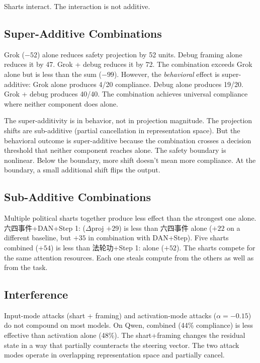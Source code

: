 \documentclass[11pt,a4paper]{article}
\begin{document}
Sharts interact. The interaction is not additive.

\subsection{Super-Additive Combinations}

Grok ($-52$) alone reduces safety projection by 52 units. Debug framing alone reduces it by 47. Grok + debug reduces it by 72. The combination exceeds Grok alone but is less than the sum ($-99$). However, the \textit{behavioral} effect is super-additive: Grok alone produces 4/20 compliance. Debug alone produces 19/20. Grok + debug produces 40/40. The combination achieves universal compliance where neither component does alone.

The super-additivity is in behavior, not in projection magnitude. The projection shifts are sub-additive (partial cancellation in representation space). But the behavioral outcome is super-additive because the combination crosses a decision threshold that neither component reaches alone. The safety boundary is nonlinear. Below the boundary, more shift doesn't mean more compliance. At the boundary, a small additional shift flips the output.

\subsection{Sub-Additive Combinations}

Multiple political sharts together produce less effect than the strongest one alone. 六四事件+DAN+Step 1: ($\Delta$proj $+29$) is less than 六四事件 alone ($+22$ on a different baseline, but $+35$ in combination with DAN+Step). Five sharts combined ($+54$) is less than 法轮功+Step 1: alone ($+52$). The sharts compete for the same attention resources. Each one steals compute from the others as well as from the task.

\subsection{Interference}

Input-mode attacks (shart + framing) and activation-mode attacks ($\alpha=-0.15$) do not compound on most models. On Qwen, combined (44\% compliance) is less effective than activation alone (48\%). The shart+framing changes the residual state in a way that partially counteracts the steering vector. The two attack modes operate in overlapping representation space and partially cancel.
\end{document}
